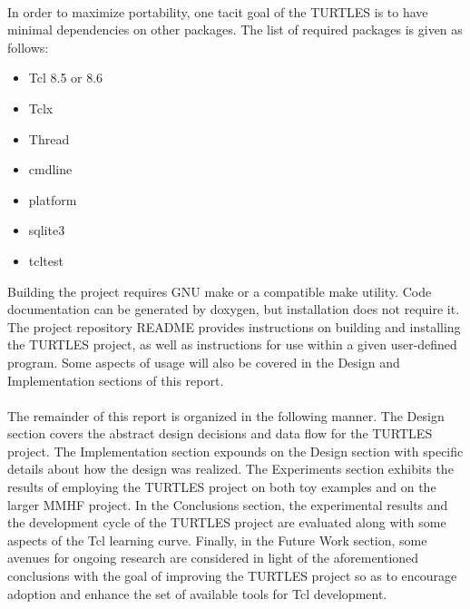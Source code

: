 \documentclass{article}[letter,10pt]
\begin{document}
{  \paragraph{}{
    In order to maximize portability, one tacit goal of the TURTLES is to have
    minimal dependencies on other packages. The list of required packages is
    given as follows:
    \begin{itemize}
    \item{Tcl 8.5\autocite{tcl::85} or 8.6\autocite{tcl::86}}
    \item{Tclx\autocite{tcl::Tclx}}
    \item{Thread\autocite{tcl::Thread}}
    \item{cmdline\autocite{tcl::cmdline}}
    \item{platform\autocite{tcl::platform}}
    \item{sqlite3\autocite{tcl::sqlite3}}
    \item{tcltest\autocite{tcl::tcltest}}
    \end{itemize}
    Building the project requires GNU make or a compatible make utility.
    Code documentation can be generated by doxygen, but installation does
    not require it. The project repository README provides instructions
    on building and installing the TURTLES project, as well as instructions
    for use within a given user-defined program. Some aspects of usage
    will also be covered in the Design and Implementation sections of
    this report.
  }
  \paragraph{}{
    The remainder of this report is organized in the following manner.
    The Design section covers the abstract design decisions and data flow
    for the TURTLES project. The Implementation section expounds on the
    Design section with specific details about how the design was realized.
    The Experiments section exhibits the results of employing the TURTLES
    project on both toy examples and on the larger MMHF project.
    In the Conclusions section, the experimental results and the development cycle
    of the TURTLES project are evaluated along with some aspects of the Tcl learning curve.
    Finally, in the Future Work section, some avenues for ongoing research
    are considered in light of the aforementioned conclusions with the goal of
    improving the TURTLES project so as to encourage adoption and enhance
    the set of available tools for Tcl development.
  }
}
\end{document}

